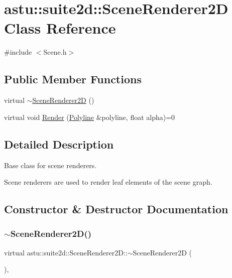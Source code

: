 \hypertarget{classastu_1_1suite2d_1_1SceneRenderer2D}{}\section{astu\+:\+:suite2d\+:\+:Scene\+Renderer2D Class Reference}
\label{classastu_1_1suite2d_1_1SceneRenderer2D}


{\ttfamily \#include $<$Scene.\+h$>$}

\subsection*{Public Member Functions}
\begin{DoxyCompactItemize}
\item 
virtual \hyperlink{classastu_1_1suite2d_1_1SceneRenderer2D_adffabde7d8adf7996abe5476cc9eecce}{$\sim$\+Scene\+Renderer2D} ()
\item 
virtual void \hyperlink{classastu_1_1suite2d_1_1SceneRenderer2D_ae7b4d1c2ea93585394b4cefe117c9db9}{Render} (\hyperlink{classastu_1_1suite2d_1_1Polyline}{Polyline} \&polyline, float alpha)=0
\end{DoxyCompactItemize}


\subsection{Detailed Description}
Base class for scene renderers.

Scene renderers are used to render leaf elements of the scene graph. 

\subsection{Constructor \& Destructor Documentation}
\mbox{\label{classastu_1_1suite2d_1_1SceneRenderer2D_adffabde7d8adf7996abe5476cc9eecce}} 
\subsubsection{\texorpdfstring{$\sim$\+Scene\+Renderer2\+D()}{~SceneRenderer2D()}}
{\footnotesize\ttfamily virtual astu\+::suite2d\+::\+Scene\+Renderer2\+D\+::$\sim$\+Scene\+Renderer2D (\begin{DoxyParamCaption}{ }\end{DoxyParamCaption})\hspace{0.3cm}{\ttfamily [inline]}, {\ttfamily [virtual]}}

